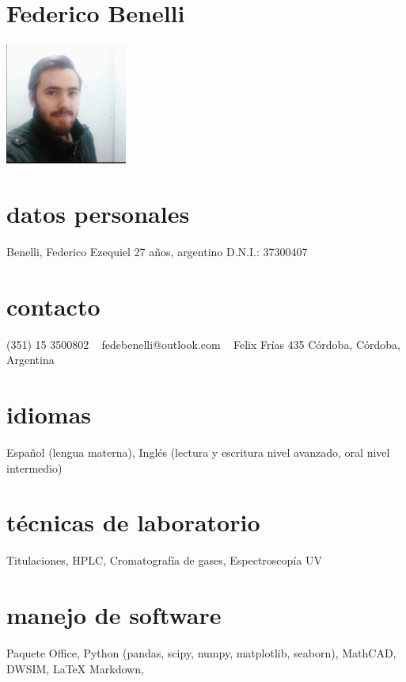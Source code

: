 \documentclass[espanol]{cv-style}     %
\begin{document}
\lastupdated

\begin{aside}
\section{Federico Benelli}
\includegraphics[width=4cm]{ppic.jpg}
%
\section{datos personales}
Benelli, Federico Ezequiel
27 años, argentino
D.N.I.: 37300407
%
\section{contacto}
(351) 15 3500802
~
fedebenelli@outlook.com
~
Felix Frías 435
Córdoba, Córdoba, Argentina
%
\section{idiomas}
Español (lengua materna),
Inglés (lectura y escritura nivel avanzado, oral nivel intermedio)
%
\section{técnicas de laboratorio}
Titulaciones,
HPLC,
Cromatografía de gases,
Espectroscopía UV
\section{manejo de software}
Paquete Office, 
Python (pandas, scipy, numpy, matplotlib, seaborn),
MathCAD,
DWSIM,
\LaTeX
Markdown, 
%
\end{aside}

\vspace{0.2cm}
\end{document}

